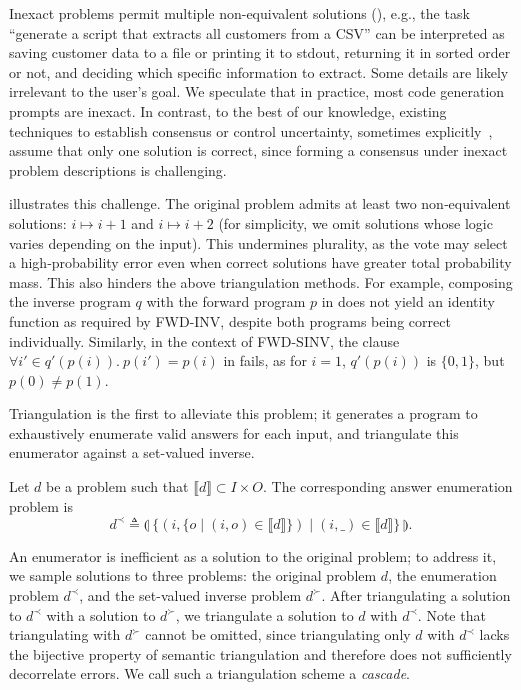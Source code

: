 \documentclass[acmsmall,screen,nonacm]{acmart}
\begin{document}
Inexact problems permit multiple non-equivalent solutions (), e.g., the task ``generate a script that extracts all customers from a CSV'' can be interpreted as saving customer data to a file or printing it to stdout, returning it in sorted order or not, and deciding which specific information to extract. Some details are likely irrelevant to the user's goal. We speculate that in practice, most code generation prompts are inexact. In contrast, to the best of our knowledge, existing techniques to establish consensus or control uncertainty, sometimes explicitly~\cite{valentin2025estimating}, assume that only one solution is correct, since forming a consensus under inexact problem descriptions is challenging.

 illustrates this challenge. The original problem admits at least two non‑equivalent solutions: $i \mapsto i+1$ and $i \mapsto i+2$ (for simplicity, we omit solutions whose logic varies depending on the input). This undermines plurality, as the vote may select a high‑probability error even when correct solutions have greater total probability mass. This also hinders the above triangulation methods. For example, composing the inverse program $q$ with the forward program $p$ in  does not yield an identity function as required by FWD-INV, despite both programs being correct individually. Similarly, in the context of FWD-SINV, the clause $\forall i' \in q'(p(i)).\ p(i') = p(i)$ in  fails, as for $i=1$, $q'(p(i))$ is $\{0, 1\}$, but $p(0) \neq p(1)$.

Triangulation is the first to alleviate this problem; it generates a program to exhaustively enumerate valid answers for each input, and triangulate this enumerator against a set-valued inverse.

\begin{definition}
  Let $d$ be a problem such that $\llbracket d \rrbracket\subset I\times O$. The corresponding answer enumeration problem is $$d^{\prec} \triangleq \llparenthesis\ \bigl\{(i, \{o \mid (i, o) \in \llbracket d \rrbracket \}) \mid (i, \_) \in \llbracket d \rrbracket \bigr\}\ \rrparenthesis.$$
\end{definition}

An enumerator is inefficient as a solution to the original problem; to address it, we sample solutions to three problems: the original problem $d$, the enumeration problem $d^{\prec}$, and the set-valued inverse problem $d^{\succ}$. After triangulating a solution to $d^{\prec}$ with a solution to $d^{\succ}$, we triangulate a solution to $d$ with $d^{\prec}$. Note that triangulating with $d^{\succ}$ cannot be omitted, since triangulating only $d$ with $d^{\prec}$ lacks the bijective property of semantic triangulation and therefore does not sufficiently decorrelate errors. We call such a triangulation scheme a \emph{cascade}.
\end{document}
